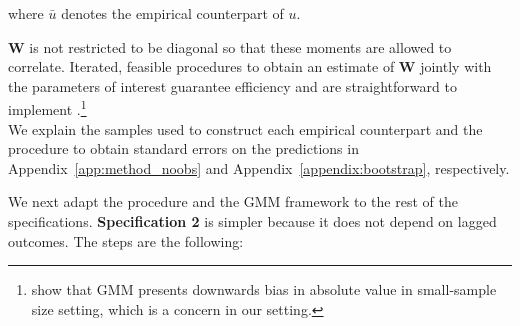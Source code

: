 \noindent where $\bar{u}$ denotes the empirical counterpart of $u$.

\noindent $\bm{W}$ is not restricted to be diagonal so that these moments are allowed to correlate. Iterated, feasible procedures to obtain an estimate of $\bm{W}$ jointly with the parameters of interest guarantee efficiency and are straightforward to implement \citep{Hansen_1982_Econometrica,Amemiya_1985_advanced}.\footnote{\citet{Altonji_Segal_1996_JoBaES} show that GMM presents downwards bias in absolute value in small-sample size setting, which is a concern in our setting.}\\

\noindent We explain the samples used to construct each empirical counterpart and the procedure to obtain standard errors on the predictions in Appendix~\ref{app:method_noobs} and Appendix~\ref{appendix:bootstrap}, respectively.

\noindent We next adapt the procedure and the GMM framework to the rest of the specifications. \textbf{Specification 2} is simpler because it does not depend on lagged outcomes. The steps are the following:

